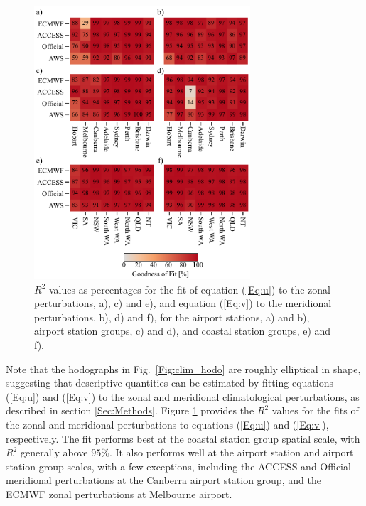 \documentclass{ametsoc}
\begin{document}
\begin{figure}
\centering
\includegraphics[width=19pc]{r_squared.pdf}
\caption{$R^2$ values as percentages for the fit of equation (\ref{Eq:u}) to the zonal perturbations, a), c) and e), and equation (\ref{Eq:v}) to the meridional perturbations, b), d) and f), for the airport stations, a) and b), airport station groups, c) and d), and coastal station groups, e) and f).}
\label{Fig:r_squared}
\end{figure}

Note that the hodographs in Fig.~\ref{Fig:clim_hodo} are roughly elliptical in shape, suggesting that descriptive quantities can be estimated by fitting equations (\ref{Eq:u}) and (\ref{Eq:v}) to the zonal and meridional climatological perturbations, as described in section \ref{Sec:Methods}. Figure \ref{Fig:r_squared} provides the $R^2$ values for the fits of the zonal and meridional perturbations to equations (\ref{Eq:u}) and (\ref{Eq:v}), respectively. The fit performs best at the coastal station group spatial scale, with $R^2$ generally above $95\%$. It also performs well at the airport station and airport station group scales, with a few exceptions, including the ACCESS and Official meridional perturbations at the Canberra airport station group, and the ECMWF zonal perturbations at Melbourne airport. 
\end{document}
